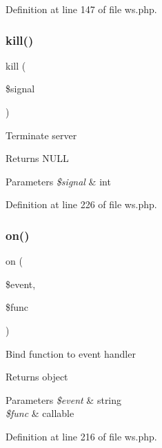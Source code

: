 Definition at line 147 of file ws.\+php.

\hypertarget{class_c_l_i_1_1_w_s_a2e5652a68528b58bda9e63311cd473bd}{}\label{class_c_l_i_1_1_w_s_a2e5652a68528b58bda9e63311cd473bd} 
\subsubsection{\texorpdfstring{kill()}{kill()}}
{\footnotesize\ttfamily kill (\begin{DoxyParamCaption}\item[{}]{\$signal }\end{DoxyParamCaption})}

Terminate server \begin{DoxyReturn}{Returns}
N\+U\+LL 
\end{DoxyReturn}

\begin{DoxyParams}{Parameters}
{\em \$signal} & int \\
\hline
\end{DoxyParams}


Definition at line 226 of file ws.\+php.

\hypertarget{class_c_l_i_1_1_w_s_a65a51fe8cfc1c6b4d04178b209b50e23}{}\label{class_c_l_i_1_1_w_s_a65a51fe8cfc1c6b4d04178b209b50e23} 
\subsubsection{\texorpdfstring{on()}{on()}}
{\footnotesize\ttfamily on (\begin{DoxyParamCaption}\item[{}]{\$event,  }\item[{}]{\$func }\end{DoxyParamCaption})}

Bind function to event handler \begin{DoxyReturn}{Returns}
object 
\end{DoxyReturn}

\begin{DoxyParams}{Parameters}
{\em \$event} & string \\
\hline
{\em \$func} & callable \\
\hline
\end{DoxyParams}


Definition at line 216 of file ws.\+php.

